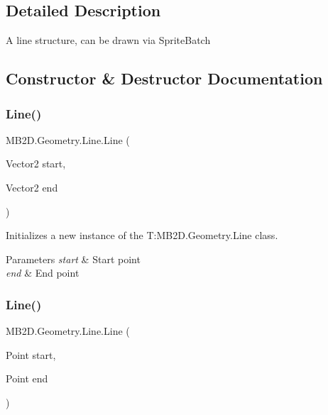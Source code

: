 \subsection{Detailed Description}
A line structure, can be drawn via Sprite\+Batch 



\subsection{Constructor \& Destructor Documentation}
\hypertarget{class_m_b2_d_1_1_geometry_1_1_line_a72a1804c7d045920d82ed26689fe10c6}{}\label{class_m_b2_d_1_1_geometry_1_1_line_a72a1804c7d045920d82ed26689fe10c6} 
\subsubsection{\texorpdfstring{Line()}{Line()}\hspace{0.1cm}{\footnotesize\ttfamily [1/2]}}
{\footnotesize\ttfamily M\+B2\+D.\+Geometry.\+Line.\+Line (\begin{DoxyParamCaption}\item[{Vector2}]{start,  }\item[{Vector2}]{end }\end{DoxyParamCaption})\hspace{0.3cm}{\ttfamily [inline]}}



Initializes a new instance of the T\+:\+M\+B2\+D.\+Geometry.\+Line class. 


\begin{DoxyParams}{Parameters}
{\em start} & Start point\\
\hline
{\em end} & End point\\
\hline
\end{DoxyParams}
\hypertarget{class_m_b2_d_1_1_geometry_1_1_line_a7c3e02a1c56c94be46ce9ad55eaa87b8}{}\label{class_m_b2_d_1_1_geometry_1_1_line_a7c3e02a1c56c94be46ce9ad55eaa87b8} 
\subsubsection{\texorpdfstring{Line()}{Line()}\hspace{0.1cm}{\footnotesize\ttfamily [2/2]}}
{\footnotesize\ttfamily M\+B2\+D.\+Geometry.\+Line.\+Line (\begin{DoxyParamCaption}\item[{Point}]{start,  }\item[{Point}]{end }\end{DoxyParamCaption})\hspace{0.3cm}{\ttfamily [inline]}}




